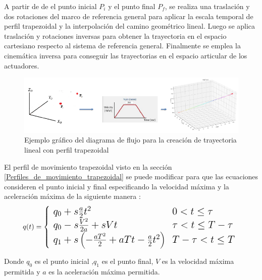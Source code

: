     A partir de de el punto inicial $P_i$ y el punto final $P_f$, se realiza una traslación y dos rotaciones del marco de referencia general para aplicar la escala temporal de perfil trapezoidal y la interpolación del camino geométrico lineal. Luego se aplica traslación y rotaciones inversas para obtener la trayectoria en el espacio cartesiano respecto al sistema de referencia general. Finalmente se emplea la cinemática inversa para conseguir las trayectorias en el espacio articular de los actuadores.     
    
         \begin{figure}[htb]
            \centering
            \includegraphics[width=0.9\linewidth]{Main/Chapter6/Images6/cap6_trayectory_1.png}
            \caption{Ejemplo gráfico del diagrama de flujo para la creación de trayectoria lineal con perfil trapezoidal}
            \label{f:cap6_trayectory_5}
        \end{figure}    
    \newpage
    
    \newpage
    
    El perfil de movimiento trapezoidal visto en la sección \ref{Perfiles_de_movimiento_trapezoidal} se puede modificar para que las ecuaciones consideren el punto inicial y final especificando la velocidad máxima y la aceleración máxima de la siguiente manera \cite{tray_trape}:
        \begin{equation}
        \Large
            q(t) = \left\lbrace
                \begin{array}{ll}
                q_0 + s\frac{a}{2}t^2&   0< t \leq \tau\\
                q_0 - s\frac{V^2}{2a}+sVt &  \tau< t \leq T- \tau\\
                q_1 + s \left( -\frac{aT^2}{2}+aTt-\frac{a}{2}t^2 \right) &  T- \tau< t \leq T\\
            \end{array}
            \right.
            \label{eq:cap6_tray_1}
        \end{equation}

    Donde $q_0$ es el punto inicial ,$q_1$ es el punto final, $V$ es la velocidad máxima permitida y $a$ es la aceleración máxima permitida.



